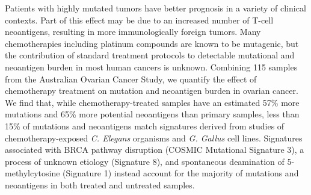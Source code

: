 Patients with highly mutated tumors have better prognosis in a variety of clinical contexts. Part of this effect may be due to an increased number of T-cell neoantigens, resulting in more immunologically foreign tumors. Many chemotherapies including platinum compounds are known to be mutagenic, but the contribution of standard treatment protocols to detectable mutational and neoantigen burden in most human cancers is unknown. Combining 115 samples from the Australian Ovarian Cancer Study, we quantify the effect of chemotherapy treatment on mutation and neoantigen burden in ovarian cancer. We find that, while chemotherapy-treated samples have an estimated 57\% more mutations and 65\% more potential neoantigens than primary samples, less than 15\% of mutations and neoantigens match signatures derived from studies of chemotherapy-exposed \textit{C. Elegans} organisms and \textit{G. Gallus} cell lines. Signatures associated with BRCA pathway disruption (COSMIC Mutational Signature 3), a process of unknown etiology (Signature 8), and spontaneous deamination of 5-methylcytosine (Signature 1) instead account for the majority of mutations and neoantigens in both treated and untreated samples.


